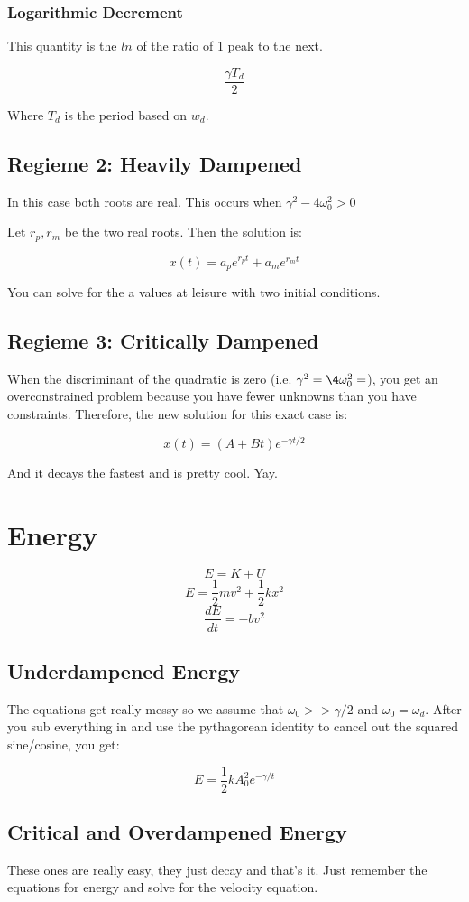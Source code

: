 \documentclass[a4paper,12pt]{report}
\begin{document}
\subsubsection{Logarithmic Decrement}
This quantity is the $ln$ of the ratio of 1 peak to the next.

$$\frac{\gamma T_d}{2}$$

Where $T_d$ is the period based on $w_d$.

\subsection{Regieme 2: Heavily Dampened}
In this case both roots are real. This occurs when $\gamma^2-4\omega_0^2 > 0$

Let $r_p, r_m$ be the two real roots. Then the solution is:

$$x(t) = a_pe^{r_pt} + a_me^{r_mt}$$

You can solve for the a values at leisure with two initial conditions.

\subsection{Regieme 3: Critically Dampened}
When the discriminant of the quadratic is zero (i.e. $\gamma^2 = \4\omega_0^2 = $), you
get an overconstrained problem because you have fewer unknowns than you have constraints.
Therefore, the new solution for this exact case is:

$$x(t) = (A + Bt)e^{-\gamma t/2}$$

And it decays the fastest and is pretty cool. Yay.

\section{Energy}
$$E = K + U$$
$$E = \frac{1}{2}mv^2 + \frac{1}{2}kx^2$$
$$\frac{dE}{dt} = -bv^2$$

\subsection{Underdampened Energy}
The equations get really messy so we assume that $\omega_0 >> \gamma/2$ and $\omega_0 = \omega_d$. After 
you sub everything in and use the pythagorean identity to cancel out the squared sine/cosine,
you get:

$$E = \frac{1}{2} kA_0^2e^{-\gamma/t}$$

\subsection{Critical and Overdampened Energy}
These ones are really easy, they just decay and that's it. Just remember the equations for 
energy and solve for the velocity equation.
\end{document}
